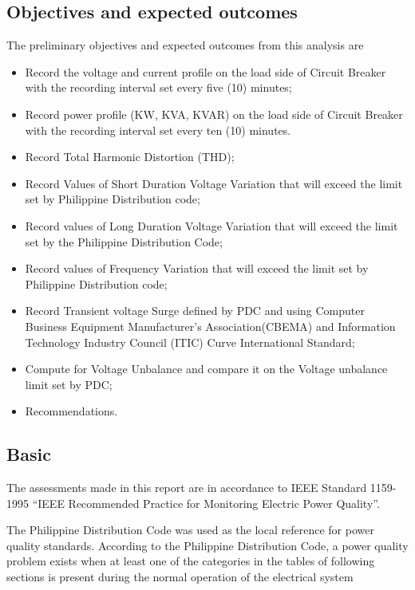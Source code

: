 \subsection{Objectives and expected outcomes}
The preliminary objectives and expected outcomes from this analysis are
\begin{itemize}
	\item Record the voltage and current profile on the load side of Circuit Breaker with the recording interval  set every five (10) minutes;
	
	\item 	Record power profile (KW, KVA, KVAR) on the load side of Circuit Breaker  with the recording interval  set every ten (10) minutes.
	
	\item	 Record Total Harmonic Distortion (THD);
	
	\item 	Record Values of Short Duration Voltage Variation that will exceed the limit set by Philippine Distribution code;
	
	\item 	Record values of Long Duration Voltage Variation that will exceed the limit set by the Philippine Distribution Code;
	
	\item 	Record values of Frequency Variation that will exceed the limit set by Philippine Distribution code;
	
	\item 	Record Transient voltage Surge defined by PDC and using Computer Business Equipment  Manufacturer’s Association(CBEMA) and Information Technology 	Industry Council (ITIC) Curve International Standard;
	
	\item 	Compute for Voltage Unbalance and compare it on the Voltage unbalance limit set by PDC;
	
	\item     Recommendations.
	
\end{itemize}

\subsection{Basic}

The assessments made in this report are in accordance to IEEE Standard 1159-1995 “IEEE Recommended Practice for Monitoring Electric Power Quality”.

The Philippine Distribution Code was used as the local reference for power quality standards. According to the Philippine Distribution Code, a power quality problem exists when at least one of the categories in the tables of following sections is present during the normal operation of the electrical system



